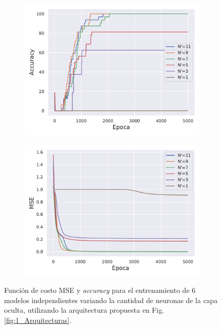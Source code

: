 \begin{figure}[h!]
    \centering
    \begin{subfigure}[h]{0.49\textwidth} 
        \includegraphics[width=\textwidth]{Figuras/ej2/Acc.pdf}
    \end{subfigure}       
    \begin{subfigure}[h]{0.49\textwidth} 
        \includegraphics[width=\textwidth]{Figuras/ej2/Loss.pdf}
    \end{subfigure}
    \caption{Función de costo MSE y \textit{accuracy} para el entrenamiento de 6 modelos independientes variando la cantidad de neuronas de la capa oculta, utilizando la arquitectura propuesta en Fig. \ref{fig:1_Arquitecturas}.}
    \label{fig:2_Resultados}
\end{figure}